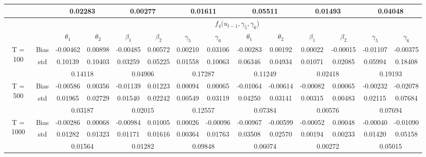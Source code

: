 \documentclass[a4paper,12pt,times,numbered,print,index]{report}
\numberwithin{equation}{section}
\begin{document}
\begin{table}[htbp]
\begin{adjustbox}{max width=\textwidth}
\begin{tabular}{cccccccccccccc}
          &       & \multicolumn{2}{c}{0.02283} & \multicolumn{2}{c}{0.00277} & \multicolumn{2}{c}{0.01611} & \multicolumn{2}{c}{0.05511} & \multicolumn{2}{c}{0.01493} & \multicolumn{2}{c}{0.04048} \\
    \midrule
    &       & \multicolumn{12}{c}{$f_4 (u_{t-1}, \gamma_5, \gamma_6$)}                \\
	&       & $\theta_1$ & $\theta_2$ & $\beta_1$ & $\beta_2$ & $\gamma_5$ & $\gamma_{6}$ & $\theta_1$ & $\theta_2$ & $\beta_1$ & $\beta_2$ & $\gamma_5$ & $\gamma_{6}$ \\
    \midrule
    \multirow{3}[1]{*}{T = 100} & Bias  & -0.00462 & 0.00898 & -0.00485 & 0.00572 & 0.00210 & 0.03106 & -0.00283 & 0.00192 & 0.00022 & -0.00015 & -0.01107 & -0.00375 \\
          & std   & 0.10139 & 0.10403 & 0.03259 & 0.05225 & 0.01558 & 0.10063 & 0.06346 & 0.04934 & 0.01071 & 0.02085 & 0.05994 & 0.18408 \\
          &       & \multicolumn{2}{c}{0.14118} & \multicolumn{2}{c}{0.04906} & \multicolumn{2}{c}{\textcolor[rgb]{ .329,  .51,  .208}{0.17287}} & \multicolumn{2}{c}{0.11249} & \multicolumn{2}{c}{0.02418} & \multicolumn{2}{c}{\textcolor[rgb]{ .329,  .51,  .208}{0.19193}} \\
    \multirow{3}[0]{*}{T = 500} & Bias  & -0.00586 & 0.00356 & -0.01139 & 0.01223 & 0.00094 & 0.00065 & -0.01064 & -0.00614 & -0.00082 & 0.00065 & -0.00232 & -0.02078 \\
          & std   & 0.01965 & 0.02729 & 0.01540 & 0.02242 & 0.00549 & 0.03119 & 0.04250 & 0.03141 & 0.00315 & 0.00483 & 0.02115 & 0.07684 \\
          &       & \multicolumn{2}{c}{0.03187} & \multicolumn{2}{c}{0.02015} & \multicolumn{2}{c}{\textcolor[rgb]{ .329,  .51,  .208}{0.12557}} & \multicolumn{2}{c}{0.07384} & \multicolumn{2}{c}{0.00576} & \multicolumn{2}{c}{\textcolor[rgb]{ .329,  .51,  .208}{0.07694}} \\
    \multirow{3}[1]{*}{T = 1000} & Bias  & -0.00286 & 0.00068 & -0.00984 & 0.01005 & 0.00026 & -0.00096 & -0.00967 & -0.00599 & -0.00052 & 0.00048 & -0.00040 & -0.01090 \\
          & std   & 0.01282 & 0.01323 & 0.01171 & 0.01616 & 0.00364 & 0.01763 & 0.03508 & 0.02570 & 0.00194 & 0.00233 & 0.01420 & 0.05158 \\
          &       & \multicolumn{2}{c}{0.01564} & \multicolumn{2}{c}{0.01282} & \multicolumn{2}{c}{\textcolor[rgb]{ .329,  .51,  .208}{0.09848}} & \multicolumn{2}{c}{0.06074} & \multicolumn{2}{c}{0.00272} & \multicolumn{2}{c}{\textcolor[rgb]{ .329,  .51,  .208}{0.05015}} \\
    \bottomrule
    \bottomrule
    \end{tabular}%
    \end{adjustbox}
  \label{s_f34}%
\end{table}%
\end{document}
